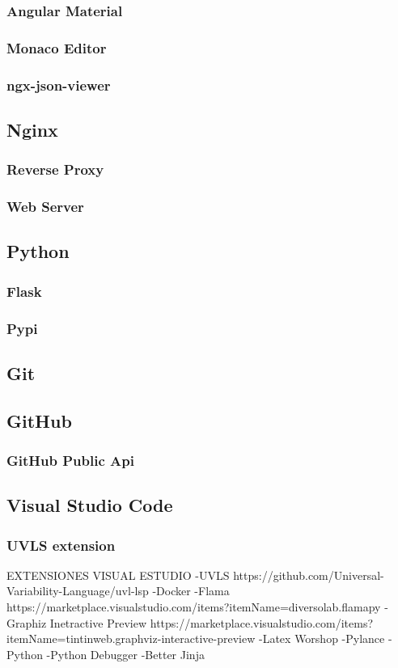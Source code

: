 \documentclass[12pt, a4paper, twoside]{article}
\begin{document}
\subsubsection{Angular Material}
\subsubsection{Monaco Editor}
\subsubsection{ngx-json-viewer}

\subsection{Nginx}
\subsubsection{Reverse Proxy}
\subsubsection{Web Server}

\subsection{Python}
\subsubsection{Flask}
\subsubsection{Pypi}

\subsection{Git}
\subsection{GitHub}
\subsubsection{GitHub Public Api}
\blindtext

\subsection{Visual Studio Code}
\subsubsection{UVLS extension}
EXTENSIONES VISUAL ESTUDIO
	-UVLS https://github.com/Universal-Variability-Language/uvl-lsp
	-Docker
	-Flama https://marketplace.visualstudio.com/items?itemName=diversolab.flamapy
	-Graphiz Inetractive Preview https://marketplace.visualstudio.com/items?itemName=tintinweb.graphviz-interactive-preview
	-Latex Worshop
	-Pylance
	-Python
	-Python Debugger
	-Better Jinja
\end{document}
